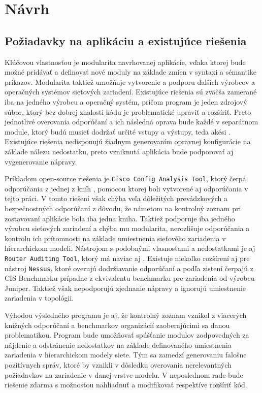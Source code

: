 \chapter{Návrh}

\section{Požiadavky na aplikáciu a existujúce riešenia}
Kľúčovou vlastnosťou je modularita navrhovanej aplikácie, vďaka ktorej bude možné pridávať a definovať nové moduly na základe zmien v syntaxi a sémantike príkazov. Modularita taktiež umožňuje vytvorenie a podporu ďalších výrobcov a operačných systémov sieťových zariadení. Existujúce riešenia sú zväčša zamerané iba na jedného výrobcu a operačný systém, pričom program je jeden zdrojový súbor, ktorý bez dobrej znalosti kódu je problematické upraviť a rozšíriť. Preto jednotlivé overovania odporúčaní a ich následná oprava bude každé v separátnom module, ktorý budú musieť dodržať určité vstupy a výstupy, teda akési . Existujúce riešenia nedisponujú žiadnym generovaním opravnej konfigurácie na základe nálezu nedostatku, preto vzniknutá aplikácia bude podporovať aj vygenerovanie nápravy.

Príkladom open-source riešenia je \texttt{Cisco Config Analysis Tool}, ktorý čerpá odporúčania z jednej z kníh \cite{Singh2018}, pomocou ktorej boli vytvorené aj odporúčania v tejto práci. V tomto riešení však chýba veľa dôležitých prevádzkových a bezpečnostných odporúčaní z dôvodu, že námetom na kontrolný zoznam pri zostavovaní aplikácie bola iba jedna kniha. Taktiež podporuje iba jedného výrobcu sieťových zariadení a chýba mu modularita, nerozlišuje odporúčania a kontrolu ich prítomnosti na základe umiestnenia sieťového zariadenia v hierarchickom modeli. Nástrojom s podobnými vlasnosťami a nedostatkami je aj \texttt{Router Auditing Tool}, ktorý má naviac aj . Existuje niekoľko rozšírení aj pre nástroj \texttt{Nessus}, ktoré overujú dodržiavanie odporúčaní a podľa zistení čerpajú z CIS Benchmarku \cite{CIS_DrTLsgXv24lxeIIM} prípadne z ekvivalentu benchmarku pre zariadenia od výrobcu Juniper. Taktiež však nepodporujú zjednanie nápravy a ignorujú umiestnenie zariadenia v topológii.     

Výhodou výsledného programu je aj, že kontrolný zoznam vznikol z viacerých knižných odporúčaní a benchmarkov organizácií zaoberajúcimi sa danou problematikou. Program bude umožňovať spúšťanie modulov zodpovedných za nájdenie a odstránenie nedostatkov na základe definovaného umiestnenia zariadenia v hierarchickom modely siete. Tým sa zamedzí generovaniu falošne pozitívnych správ, ktoré by vznikli v dôsledku overovania nerelevantných požiadavkov na zariadenie v danej vrstve modelu. V neposlednom rade bude riešenie zdarma s možnosťou nahliadnuť a modifikovať respektíve rozšíriť kód.


